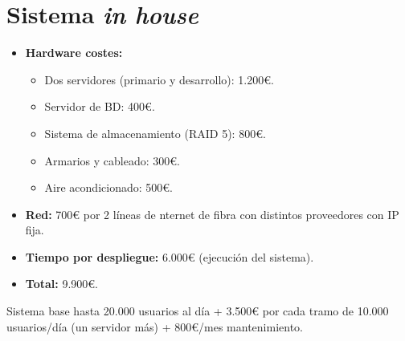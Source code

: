 
\section{Sistema \textit{in house}}
\begin{itemize}
\item \textbf{Hardware costes:}
\begin{itemize}
	\item Dos servidores (primario y desarrollo): 1.200\euro.
	\item Servidor de BD: 400\euro.
	\item Sistema de almacenamiento (RAID 5): 800\euro.
	\item Armarios y cableado: 300\euro.
	\item Aire acondicionado: 500\euro.  
\end{itemize}

\item \textbf {Red:} 700\euro \hspace{1pt} por 2 líneas de nternet de fibra con distintos proveedores con IP fija.

\item \textbf{Tiempo por despliegue:} 6.000\euro \hspace{1pt} (ejecución del sistema).

\item \textbf{Total:} 9.900\euro.
\end{itemize}

Sistema base hasta 20.000 usuarios al día + 3.500\euro \hspace{1pt} por cada tramo de 10.000 usuarios/día (un servidor más) + 800\euro/mes mantenimiento.


